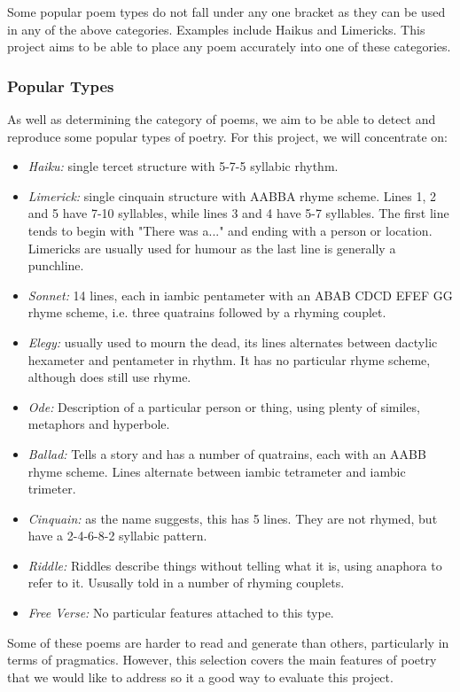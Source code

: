 Some popular poem types do not fall under any one bracket as they can be used in any of the above categories. Examples include Haikus and Limericks. This project aims to be able to place any poem accurately into one of these categories.

\subsubsection{Popular Types}
As well as determining the category of poems, we aim to be able to detect and reproduce some popular types of poetry. For this project, we will concentrate on:
\begin{itemize}
\item{\textit{Haiku:} single tercet structure with 5-7-5 syllabic rhythm.}
\item{\textit{Limerick:} single cinquain structure with AABBA rhyme scheme. Lines 1, 2 and 5 have 7-10 syllables, while lines 3 and 4 have 5-7 syllables. The first line tends to begin with "There was a..." and ending with a person or location. Limericks are usually used for humour as the last line is generally a punchline.}
\item{\textit{Sonnet:} 14 lines, each in iambic pentameter with an ABAB CDCD EFEF GG rhyme scheme, i.e. three quatrains followed by a rhyming couplet.}
\item{\textit{Elegy:} usually used to mourn the dead, its lines alternates between dactylic hexameter and pentameter in rhythm. It has no particular rhyme scheme, although does still use rhyme. }
\item{\textit{Ode:} Description of a particular person or thing, using plenty of similes, metaphors and hyperbole.}
\item{\textit{Ballad:} Tells a story and has a number of quatrains, each with an AABB rhyme scheme. Lines alternate between iambic tetrameter and iambic trimeter.}
\item{\textit{Cinquain:} as the name suggests, this has 5 lines. They are not rhymed, but have a 2-4-6-8-2 syllabic pattern. }
\item{\textit{Riddle:} Riddles describe things without telling what it is, using anaphora to refer to it. Ususally told in a number of rhyming couplets.}
\item{\textit{Free Verse:} No particular features attached to this type.}
\end{itemize} 

Some of these poems are harder to read and generate than others, particularly in terms of pragmatics. However, this selection covers the main features of poetry that we would like to address so it a good way to evaluate this project.


